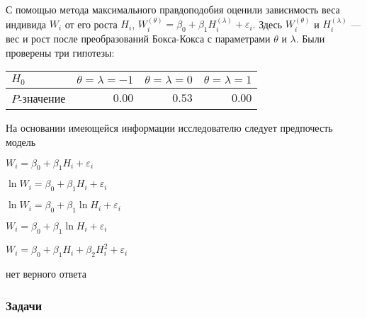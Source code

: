 \begin{question}
С помощью метода максимального правдоподобия оценили зависимость веса индивида $W_i$ от его роста $H_i$, $W_i^{(\theta)} = \beta_0 + \beta_1 H_i^{(\lambda)} + \varepsilon_i$. Здесь $W_i^{(\theta)}$ и $H_i^{(\lambda)}$ — вес и рост после преобразований Бокса-Кокса с параметрами $\theta$ и $\lambda$.
Были проверены три гипотезы:

\begin{tabular}{lrrr} \toprule
$H_0$ & $\theta=\lambda=-1$ & $\theta=\lambda=0$ & $\theta=\lambda=1$ \\
\midrule
$P$-значение & $0.00$ & $0.53$ & $0.00$ \\
\bottomrule
\end{tabular}

На основании имеющейся информации исследователю следует предпочесть модель
\begin{answerlist}
  \item $W_i = \beta_0 + \beta_1 H_i + \varepsilon_i$
  \item $\ln W_i = \beta_0 + \beta_1 H_i + \varepsilon_i$  
  \item $\ln W_i = \beta_0 + \beta_1 \ln H_i + \varepsilon_i$  
  \item $W_i = \beta_0 + \beta_1 \ln H_i + \varepsilon_i$  
  \item $W_i = \beta_0 + \beta_1 H_i + \beta_2 H_i^2 + \varepsilon_i$
  \item нет верного ответа
\end{answerlist}
\end{question}


\subsubsection*{Задачи}

